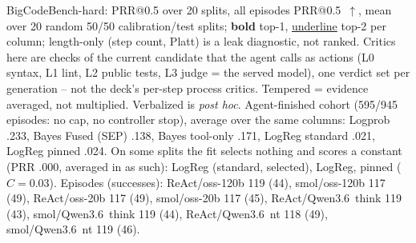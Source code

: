 \documentclass[10pt, aspectratio=43]{beamer}
\begin{document}
\begin{frame}{BigCodeBench-hard: PRR@0.5 over 20 splits, all episodes}
\vspace{0.25em}
\fontsize{6}{7}\selectfont
PRR@0.5~$\uparrow$, mean over 20 random 50/50 calibration/test splits; \textbf{bold} top-1,
\underline{underline} top-2 per column; length-only (step count, Platt) is a leak diagnostic, not ranked.
Critics here are checks of the current candidate that the agent calls as actions (L0 syntax, L1 lint,
L2 public tests, L3 judge = the served model), one verdict set per generation -- not the deck's
per-step process critics. Tempered = evidence averaged, not multiplied. Verbalized is \emph{post hoc}.
Agent-finished cohort (595/945 episodes: no cap, no controller stop), average over the same columns: Logprob .233, Bayes Fused (SEP) .138, Bayes tool-only .171, LogReg standard .021, LogReg pinned .024.
On some splits the fit selects nothing and scores a constant (PRR .000, averaged in as such): LogReg (standard, selected), LogReg, pinned ($C{=}0.03$).
Episodes (successes): ReAct/oss-120b 119 (44), smol/oss-120b 117 (49), ReAct/oss-20b 117 (49), smol/oss-20b 117 (45), ReAct/Qwen3.6~think 119 (43), smol/Qwen3.6~think 119 (44), ReAct/Qwen3.6~nt 118 (49), smol/Qwen3.6~nt 119 (46).
\end{frame}
\end{document}

